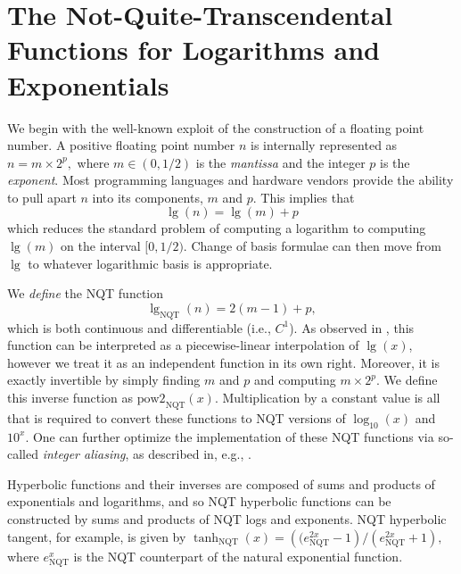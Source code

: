 \documentclass[a4paper,fleqn]{cas-sc}
\begin{document}
\section{The Not-Quite-Transcendental Functions for Logarithms and Exponentials}
\label{sec:introducing:NQT}

We begin with the well-known exploit of the construction of a floating
point number. A positive floating point number $n$ is internally
represented as
  $n = m \times 2^p,$
where $m\in (0, 1/2)$ is the \textit{mantissa} and the integer $p$ is
the \textit{exponent}. Most programming languages and hardware vendors
provide the ability to pull apart $n$ into its components, $m$ and
$p$.  This implies that
\begin{equation}
  \label{eq:approx:log}
  \lg(n) = \lg(m) + p
\end{equation}
which reduces the standard problem of computing a logarithm to
computing $\lg(m)$ on the interval $[0, 1/2)$. Change of basis
formulae can then move from $\lg$ to whatever logarithmic basis is
appropriate.

We \textit{define} the NQT function
\begin{equation}
  \label{eq:def:lg:NQT}
  \lg_{\text{NQT}}(n) = 2 (m - 1) + p,
\end{equation}
which is both continuous and differentiable (i.e., $C^1$). As observed
in \citet{Hall}, this function can be interpreted as a
piecewise-linear interpolation of $\lg(x)$, however we treat it as an
independent function in its own right. Moreover, it is exactly
invertible by simply finding $m$ and $p$ and computing $m \times
2^p$. We define this inverse function as
$\text{pow2}_{\text{NQT}}(x)$. Multiplication by a constant value is
all that is required to convert these functions to NQT versions of
$\log_{10}(x)$ and $10^x$. One can further optimize the implementation
of these NQT functions via so-called \textit{integer aliasing}, as
described in, e.g., \citet{Blinn}.

Hyperbolic functions and their inverses are composed of sums and
products of exponentials and logarithms, and so NQT hyperbolic
functions can be constructed by sums and products of NQT logs and
exponents. NQT hyperbolic tangent, for example, is given by
  $\tanh_{\text{NQT}}(x) = \left((e_{\text{NQT}}^{2x} - 1\right)/\left(e_{\text{NQT}}^{2 x} + 1\right),$
where $e_{\text{NQT}}^x$ is the NQT counterpart of the natural
exponential function.
\end{document}
